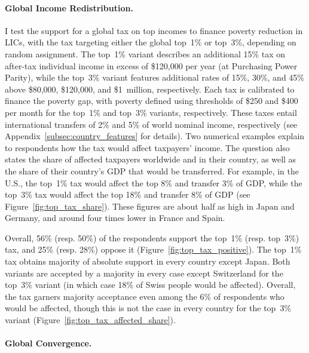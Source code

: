 \documentclass[12pt,english]{article}
\begin{document}
\begin{bibunit}
\paragraph{Global Income Redistribution.}\label{par:global_income_redistr}

I test the support for a global tax on top incomes to finance poverty reduction in LICs, with the tax targeting either the global top~1\% or top~3\%, depending on random assignment. The top~1\% variant describes an additional 15\% tax on after-tax individual income in excess of \$120,000 per year (at Purchasing Power Parity), while the top~3\% variant features additional rates of 15\%, 30\%, and 45\% above \$80,000, \$120,000, and \$1~million, respectively. Each tax is calibrated to finance the poverty gap, with poverty defined using thresholds of \$250 and \$400 per month for the top~1\% and top~3\% variants, respectively. These taxes entail international transfers of 2\% and 5\% of world nominal income, respectively (see Appendix~\ref{subsec:country_features} for details). 
Two numerical examples explain to respondents how the tax would affect taxpayers' income. The question also states the share of affected taxpayers worldwide and in their country, as well as the share of their country's GDP that would be transferred. For example, in the U.S., the top~1\% tax would affect the top 8\% and transfer 3\% of GDP, while the top~3\% tax would affect the top 18\% and transfer 8\% of GDP (see Figure~\ref{fig:top_tax_share}). These figures are about half as high in Japan and Germany, and around four times lower in France and Spain.

Overall, 56\% (resp. 50\%) of the respondents support the top~1\% (resp. top~3\%) tax, and 25\% (resp. 28\%) oppose it (Figure~\ref{fig:top_tax_positive}). 
The top~1\% tax obtains majority of absolute support in every country except Japan. 
Both variants are accepted by a majority in every case except Switzerland for the top~3\% variant (in which case 18\% of Swiss people would be affected). 
Overall, the tax garners %
majority acceptance 
even among the 6\% of respondents who would be affected, though this is not the case in every country for the top~3\% variant (Figure~\ref{fig:top_tax_affected_share}). 

\paragraph{Global Convergence.}\label{par:convergence}


\end{bibunit}
\end{document}
